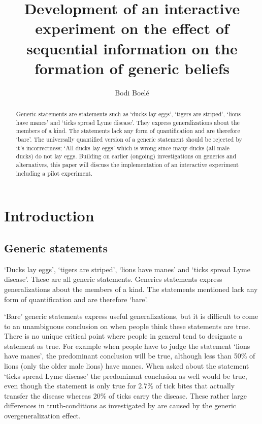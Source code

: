 \documentclass[twoside]{uva-inf-bachelor-thesis}
\title{Development of an interactive experiment on the effect of sequential information on the formation of generic beliefs}
\author{Bodi Boelé}
\begin{document}
\maketitle

\begin{abstract}
Generic statements are statements such as `ducks lay eggs', `tigers are striped', `lions have manes' and `ticks spread Lyme disease'. They express generalizations about the members of a kind. The statements lack any form of quantification and are therefore `bare'. The universally quantified version of a generic statement should be rejected by it's incorrectness; `All ducks lay eggs' which is wrong since many ducks (all male ducks) do not lay eggs. Building on earlier (ongoing) investigations on generics and alternatives, this paper will discuss the implementation of an interactive experiment including a pilot experiment.
\end{abstract}

\tableofcontents

\chapter{Introduction}
\section{Generic statements}
`Ducks lay eggs', `tigers are striped', `lions have manes' and `ticks spread Lyme disease'. These are all generic statements. Generics statements express generalizations about the members of a kind. The statements mentioned lack any form of quantification and are therefore `bare'. 

`Bare' generic statements express useful generalizations, but it is difficult to come to an unambiguous conclusion on when people think these statements are true. There is no unique critical point where people in general tend to designate a statement as true. For example when people have to judge the statement `lions have manes', the predominant conclusion will be true, although less than 50\% of lions (only the older male lions) have manes. When asked about the statement `ticks spread Lyme disease' the predominant conclusion as well would be true, even though the statement is only true for 2.7\% \parencite{rivm_2019} of tick bites that actually transfer the disease whereas 20\% of ticks carry the disease. These rather large differences in truth-conditions as investigated by \cite{leslie2011all} are caused by the generic overgeneralization effect.  
\end{document}

